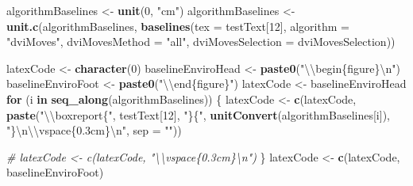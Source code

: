 \documentclass[]{article}
\newenvironment{Shaded}{\begin{snugshade}}{\end{snugshade}}
\newcommand{\KeywordTok}[1]{\textcolor[rgb]{0.13,0.29,0.53}{\textbf{#1}}}
\newcommand{\DataTypeTok}[1]{\textcolor[rgb]{0.13,0.29,0.53}{#1}}
\newcommand{\DecValTok}[1]{\textcolor[rgb]{0.00,0.00,0.81}{#1}}
\newcommand{\CharTok}[1]{\textcolor[rgb]{0.31,0.60,0.02}{#1}}
\newcommand{\StringTok}[1]{\textcolor[rgb]{0.31,0.60,0.02}{#1}}
\newcommand{\CommentTok}[1]{\textcolor[rgb]{0.56,0.35,0.01}{\textit{#1}}}
\newcommand{\ControlFlowTok}[1]{\textcolor[rgb]{0.13,0.29,0.53}{\textbf{#1}}}
\newcommand{\NormalTok}[1]{#1}
\begin{document}
\begin{Shaded}
\begin{Highlighting}[]
\NormalTok{algorithmBaselines <-}\StringTok{ }\KeywordTok{unit}\NormalTok{(}\DecValTok{0}\NormalTok{, }\StringTok{"cm"}\NormalTok{)}
\NormalTok{    algorithmBaselines <-}\StringTok{ }\KeywordTok{unit.c}\NormalTok{(algorithmBaselines, }
                                 \KeywordTok{baselines}\NormalTok{(}\DataTypeTok{tex =}\NormalTok{ testText[}\DecValTok{12}\NormalTok{],}
                                        \DataTypeTok{algorithm =} \StringTok{"dviMoves"}\NormalTok{,}
                                        \DataTypeTok{dviMovesMethod =} \StringTok{"all"}\NormalTok{,}
                                        \DataTypeTok{dviMovesSelection =}\NormalTok{ dviMovesSelection))}

\NormalTok{  latexCode <-}\StringTok{ }\KeywordTok{character}\NormalTok{(}\DecValTok{0}\NormalTok{)}
\NormalTok{  baselineEnviroHead <-}\StringTok{ }\KeywordTok{paste0}\NormalTok{(}\StringTok{"}\CharTok{\textbackslash{}\textbackslash{}}\StringTok{begin\{figure\}}\CharTok{\textbackslash{}n}\StringTok{"}\NormalTok{)}
\NormalTok{  baselineEnviroFoot <-}\StringTok{ }\KeywordTok{paste0}\NormalTok{(}\StringTok{"}\CharTok{\textbackslash{}\textbackslash{}}\StringTok{end\{figure\}"}\NormalTok{)}
\NormalTok{  latexCode <-}\StringTok{ }\NormalTok{baselineEnviroHead}
  \ControlFlowTok{for}\NormalTok{ (i }\ControlFlowTok{in} \KeywordTok{seq_along}\NormalTok{(algorithmBaselines)) \{}
\NormalTok{    latexCode <-}\StringTok{ }\KeywordTok{c}\NormalTok{(latexCode, }
                   \KeywordTok{paste}\NormalTok{(}\StringTok{"}\CharTok{\textbackslash{}\textbackslash{}}\StringTok{boxreport\{"}\NormalTok{, }
\NormalTok{                         testText[}\DecValTok{12}\NormalTok{], }
                         \StringTok{"\}\{"}\NormalTok{, }
                         \KeywordTok{unitConvert}\NormalTok{(algorithmBaselines[i]), }
                         \StringTok{"\}}\CharTok{\textbackslash{}n\textbackslash{}\textbackslash{}}\StringTok{vspace\{0.3cm\}}\CharTok{\textbackslash{}n}\StringTok{"}\NormalTok{, }
                         \DataTypeTok{sep =} \StringTok{""}\NormalTok{))}
    
    \CommentTok{# latexCode <- c(latexCode, "\textbackslash{}\textbackslash{}vspace\{0.3cm\}\textbackslash{}n")}
\NormalTok{  \}}
\NormalTok{  latexCode <-}\StringTok{ }\KeywordTok{c}\NormalTok{(latexCode, baselineEnviroFoot)}
\end{Highlighting}
\end{Shaded}
\end{document}
